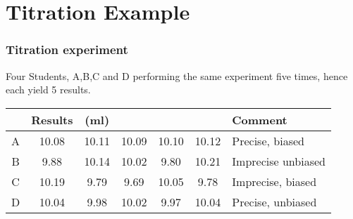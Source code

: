\documentclass{beamer}
\begin{document}
\section{Titration Example}
\begin{frame}
\frametitle{Titration experiment}
			
Four Students, A,B,C and D performing the same experiment five times, hence each yield 5 results.%
\medskip			
\begin{tabular}{|c|ccccc|l|}
				\hline
				& Results  & (ml) &  &  &  &Comment \\ \hline
				A & 10.08 & 10.11 &10.09 &10.10&10.12 & Precise, biased\\ \hline
				B & 9.88 &10.14& 10.02 &9.80& 10.21& Imprecise unbiased\\ \hline
				C & 10.19 &9.79& 9.69 &10.05& 9.78 & Imprecise, biased\\ \hline
				D & 10.04 &9.98 &10.02 &9.97 &10.04 & Precise, unbiased \\
				\hline
\end{tabular}\\
\end{frame}
\end{document}

